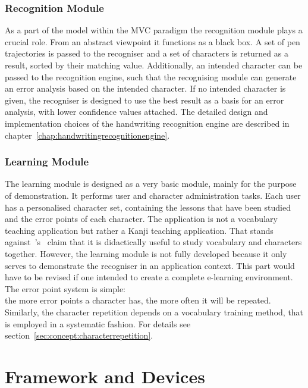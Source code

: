 \subsubsection{Recognition Module}
\label{sec:arch:recognitionmodule}
As a part of the model within the MVC paradigm the recognition module plays
a crucial role. From an abstract viewpoint it functions as a black box.
A set of pen trajectories is passed to the recogniser and a set of
characters is returned as a result, sorted by their matching value.
Additionally, an intended character can be passed to the recognition engine,
such that the recognising module can generate an error analysis based on the 
intended character. If no intended character is given, the recogniser is designed
to use the best result as a basis for an error analysis, with lower confidence
values attached. The detailed design and implementation choices of the 
handwriting recognition engine are described in 
chapter~\ref{chap:handwritingrecognitionengine}.

\subsubsection{Learning Module}
\label{sec:arch:learningmodule}

The learning module is designed as a very basic module, mainly for the purpose of 
demonstration. It performs user and character administration tasks.
Each user has a personalised character set, containing the lessons that have been
studied and the error points of each character.
The application is not a vocabulary teaching application 
but rather a Kanji teaching application. That stands 
against~\shortciteANP{}'s~\citeyear{} claim that it is didactically useful 
to study  vocabulary and characters together. However,
the learning module is not fully developed because it only serves to demonstrate
the recogniser in an application context. This part would have to be revised
if one intended to create a complete e-learning environment.
The error point system is simple:\\
the more error points a character has, the more often it will be repeated.
Similarly, the character repetition depends on a vocabulary training method,
that is employed in a systematic fashion. For details see 
section~\ref{sec:concept:characterrepetition}.

\section{Framework and Devices}
\label{sec:frameworkanddevices}

